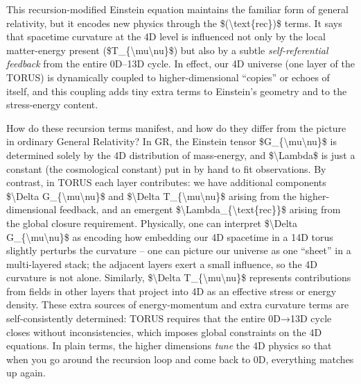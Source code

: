 \documentclass[]{article}
\begin{document}
This recursion-modified Einstein equation maintains the familiar form of
general relativity, but it encodes new physics through the
\$(\textbackslash{}text\{rec\})\$ terms. It says that spacetime
curvature at the 4D level is influenced not only by the local
matter-energy present (\$T\_\{\textbackslash{}mu\textbackslash{}nu\}\$)
but also by a subtle \emph{self-referential feedback} from the entire
0D--13D cycle. In effect, our 4D universe (one layer of the TORUS) is
dynamically coupled to higher-dimensional ``copies'' or echoes of
itself, and this coupling adds tiny extra terms to Einstein's geometry
and to the stress-energy content.

How do these recursion terms manifest, and how do they differ from the
picture in ordinary General Relativity? In GR, the Einstein tensor
\$G\_\{\textbackslash{}mu\textbackslash{}nu\}\$ is determined solely by
the 4D distribution of mass-energy, and \$\textbackslash{}Lambda\$ is
just a constant (the cosmological constant) put in by hand to fit
observations. By contrast, in TORUS each layer contributes: we have
additional components \$\textbackslash{}Delta
G\_\{\textbackslash{}mu\textbackslash{}nu\}\$ and
\$\textbackslash{}Delta T\_\{\textbackslash{}mu\textbackslash{}nu\}\$
arising from the higher-dimensional feedback, and an emergent
\$\textbackslash{}Lambda\_\{\textbackslash{}text\{rec\}\}\$ arising from
the global closure requirement. Physically, one can interpret
\$\textbackslash{}Delta G\_\{\textbackslash{}mu\textbackslash{}nu\}\$ as
encoding how embedding our 4D spacetime in a 14D torus slightly perturbs
the curvature -- one can picture our universe as one ``sheet'' in a
multi-layered stack; the adjacent layers exert a small influence, so the
4D curvature is not alone. Similarly, \$\textbackslash{}Delta
T\_\{\textbackslash{}mu\textbackslash{}nu\}\$ represents contributions
from fields in other layers that project into 4D as an effective stress
or energy density. These extra sources of energy-momentum and extra
curvature terms are self-consistently determined: TORUS requires that
the entire 0D→13D cycle closes without inconsistencies, which imposes
global constraints on the 4D equations. In plain terms, the higher
dimensions \emph{tune} the 4D physics so that when you go around the
recursion loop and come back to 0D, everything matches up again.
\end{document}
